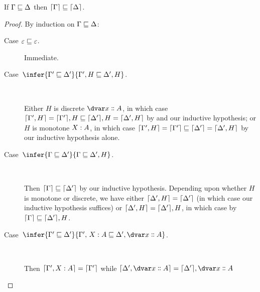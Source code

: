 
\nextlemma
\begin{lemma}\label{lemma-weakening-strip-context}
  If $\Gamma \sqsubseteq \Delta$ then $\lceil{\Gamma}\rceil \sqsubseteq \lceil{\Delta}\rceil$.
\end{lemma}
\begin{proof}
  By induction on $\Gamma \sqsubseteq \Delta$:

  \begin{description}
    \item[Case $\varepsilon \sqsubseteq \varepsilon$.] Immediate.

  \item[Case\, $\infer{\Gamma' \weaker \Delta'}{\Gamma',H \weaker \Delta',H}$.]\

    Either $H$ is discrete $\hd x A$, in which case $\lceil{\Gamma',H}\rceil =
    \lceil{\Gamma'}\rceil, H \sqsubseteq \lceil{\Delta'}\rceil, H = \lceil{\Delta',H}\rceil$ by
     and our inductive hypothesis; or $H$ is monotone $\hm x A$, in
    which case $\lceil{\Gamma',H}\rceil = \lceil{\Gamma'}\rceil \sqsubseteq \lceil{\Delta'}\rceil = \lceil{\Delta',H}\rceil$ by our inductive hypothesis alone.

  \item[Case\, $\infer{\Gamma \weaker \Delta'}{\Gamma \weaker \Delta',H}$.]\

    Then $\lceil{\Gamma}\rceil \sqsubseteq \lceil{\Delta'}\rceil$ by our inductive
    hypothesis. Depending upon whether $H$ is monotone or discrete, we have
    either $\lceil{\Delta', H}\rceil = \lceil{\Delta'}\rceil$ (in which case our
    inductive hypothesis suffices) or $\lceil{\Delta', H}\rceil = \lceil{\Delta'}\rceil,
    H$, in which case by   $\lceil{\Gamma}\rceil
    \sqsubseteq \lceil{\Delta'}\rceil, H$.

  \item[Case\, $\infer{\Gamma' \weaker \Delta'}{\Gamma',\,\hm x A \weaker
      \Delta',\hd x A}$.]\

    Then $\stripcx{\Gamma', \hm x A} = \stripcx{\Gamma'}$ while
    $\stripcx{\Delta', \hd x A} = \stripcx{\Delta'}, \hd x A$ \XXX
  \end{description}
\end{proof}


\nextlemma
\Weakening*

